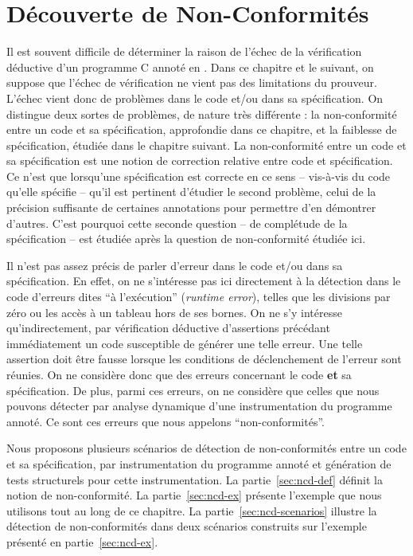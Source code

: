 
\chapter{Découverte de Non-Conformités}
\label{sec:ncd}

\chapterintro



Il est souvent difficile de déterminer la raison de l'échec de la vérification
déductive d'un programme C annoté en \eacsl.
Dans ce chapitre et le suivant, on suppose que l'échec de vérification ne vient
pas des limitations du prouveur.
L'échec vient donc de problèmes dans le code et/ou dans sa spécification.
On distingue deux sortes de problèmes, de nature très différente : la
non-conformité entre un code et sa spécification, approfondie dans ce chapitre,
et la faiblesse de spécification, étudiée dans le chapitre suivant.
La non-conformité entre un code et sa spécification est une notion de correction
relative entre code et spécification.
Ce n'est que lorsqu'une spécification est correcte en ce sens -- vis-à-vis du
code qu'elle spécifie -- qu'il est pertinent d'étudier le second problème, celui
de la précision suffisante de certaines annotations pour permettre d'en
démontrer d'autres.
C'est pourquoi cette seconde question -- de complétude de la spécification --
est étudiée après la question de non-conformité étudiée ici.

Il n'est pas assez précis de parler d'erreur dans le code et/ou dans sa
spécification.
En effet, on ne s'intéresse pas ici directement à la détection dans le code
d'erreurs dites ``à l'exécution'' (\textit{runtime error}), telles que les
divisions par zéro ou les accès à un tableau hors de ses bornes.
On ne s'y intéresse qu'indirectement, par vérification déductive d'assertions
précédant immédiatement un code susceptible de générer une telle erreur.
Une telle assertion doit être fausse lorsque les conditions de déclenchement de
l'erreur sont réunies. On ne considère donc que des erreurs concernant le code
\textbf{et} sa spécification. De plus, parmi ces erreurs, on ne considère que
celles que nous pouvons détecter par analyse dynamique d'une instrumentation du
programme annoté.
Ce sont ces erreurs que nous appelons ``non-conformités''.

Nous proposons plusieurs scénarios de détection de non-conformités entre un code
et sa spécification, par instrumentation du programme annoté et génération de
tests structurels pour cette instrumentation.
La partie~\ref{sec:ncd-def} définit la notion de non-conformité.
La partie~\ref{sec:ncd-ex} présente l'exemple que nous utilisons tout au long
de ce chapitre.
La partie~\ref{sec:ncd-scenarios} illustre la détection de non-conformités dans
deux scénarios construits sur l'exemple présenté en partie~\ref{sec:ncd-ex}.


